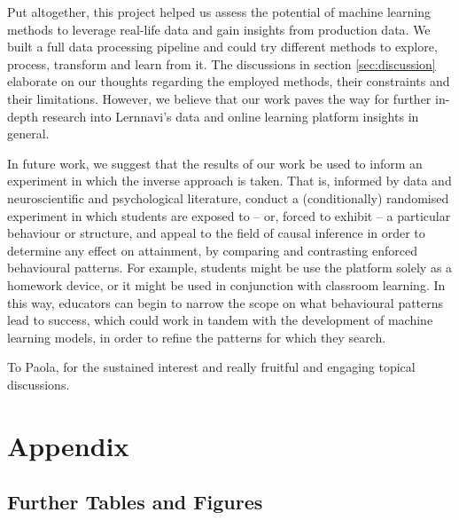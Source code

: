 \documentclass[sigplan,screen]{acmart}
\begin{document}
Put altogether, this project helped us assess the potential of machine learning methods to leverage real-life data and gain insights from production data. We built a full data processing pipeline and could try different methods to explore, process, transform and learn from it. The discussions in section \ref{sec:discussion} elaborate on our thoughts regarding the employed methods, their constraints and their limitations. However, we believe that our work paves the way for further in-depth research into Lernnavi's data and online learning platform insights in general. 

In future work, we suggest that the results of our work be used to inform an experiment in which the inverse approach is taken. That is, informed by data and neuroscientific and psychological literature, conduct a (conditionally) randomised experiment in which students are exposed to -- or, forced to exhibit -- a particular behaviour or structure, and appeal to the field of causal inference in order to determine any effect on attainment, by comparing and contrasting enforced behavioural patterns. For example, students might be use the platform solely as a homework device, or it might be used in conjunction with classroom learning. In this way, educators can begin to narrow the scope on what behavioural patterns lead to success, which could work in tandem with the development of machine learning models, in order to refine the patterns for which they search. 



\begin{acks}
To Paola, for the sustained interest and really fruitful and engaging topical discussions.
\end{acks}






\np 
\appendix
\onecolumn
\section{Appendix}
\subsection{Further Tables and Figures}
\end{document}
